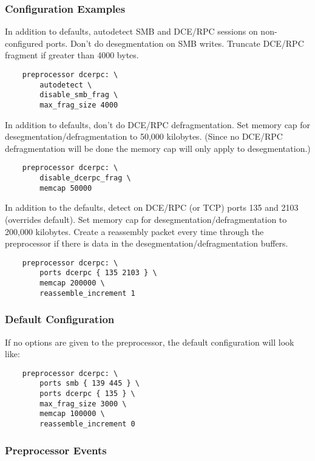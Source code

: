 \documentclass[english]{report}
\begin{document}
\subsubsection{Configuration Examples}

In addition to defaults, autodetect SMB and DCE/RPC sessions on non-configured
ports.  Don't do desegmentation on SMB writes.  Truncate DCE/RPC fragment if
greater than 4000 bytes.

\begin{verbatim}
    preprocessor dcerpc: \
        autodetect \
        disable_smb_frag \
        max_frag_size 4000
\end{verbatim}

In addition to defaults, don't do DCE/RPC defragmentation.  Set memory cap for
desegmentation/defragmentation to 50,000 kilobytes.  (Since no DCE/RPC
defragmentation will be done the memory cap will only apply to desegmentation.)

\begin{verbatim}
    preprocessor dcerpc: \
        disable_dcerpc_frag \
        memcap 50000
\end{verbatim}

In addition to the defaults, detect on DCE/RPC (or TCP) ports 135 and 2103
(overrides default).  Set memory cap for desegmentation/defragmentation to
200,000 kilobytes.  Create a reassembly packet every time through the
preprocessor if there is data in the desegmentation/defragmentation buffers.

\begin{verbatim}
    preprocessor dcerpc: \
        ports dcerpc { 135 2103 } \
        memcap 200000 \
        reassemble_increment 1
\end{verbatim}

\subsubsection{Default Configuration}

If no options are given to the preprocessor, the default configuration will
look like:

\begin{verbatim}
    preprocessor dcerpc: \
        ports smb { 139 445 } \
        ports dcerpc { 135 } \
        max_frag_size 3000 \
        memcap 100000 \
        reassemble_increment 0
\end{verbatim}

\subsubsection{Preprocessor Events}
\end{document}
